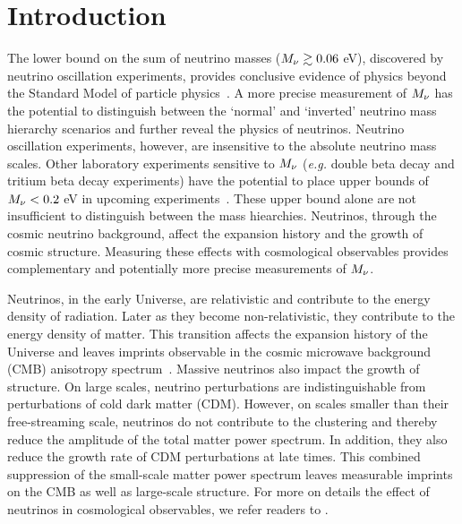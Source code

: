 \section{Introduction}
The lower bound on the sum of neutrino masses ($M_\nu \gtrsim 0.06$ eV), 
discovered by neutrino oscillation experiments, provides conclusive evidence of 
physics beyond the Standard Model of particle physics~\citep{forero2014, gonzalez-garcia2016}. 
A more precise measurement of $M_\nu$ has the potential to distinguish 
between the `normal' and `inverted' neutrino mass hierarchy scenarios 
and further reveal the physics of neutrinos. Neutrino oscillation 
experiments, however, are insensitive to the absolute neutrino mass scales. 
Other laboratory experiments sensitive to $M_\nu$ (\emph{e.g.} double beta 
decay and tritium beta decay experiments) have the potential to place upper 
bounds of $M_\nu < 0.2$ eV in upcoming experiments~\citep{bonn2011, drexlin2013}. 
These upper bound alone are not insufficient to distinguish between the mass
hiearchies. Neutrinos, through the cosmic neutrino background, affect the 
expansion history and the growth of cosmic structure. Measuring these effects 
with cosmological observables provides complementary and potentially more 
precise measurements of $M_\nu$. 

Neutrinos, in the early Universe, are relativistic and contribute to the 
energy density of radiation. Later as they become non-relativistic, 
they contribute to the energy density of matter. This transition affects 
the expansion history of the Universe and leaves imprints observable in 
the cosmic microwave background (CMB) anisotropy spectrum~\citep{lesgourgues2012, lesgourgues2014}. 
Massive neutrinos also impact the growth of structure. On large scales, 
neutrino perturbations are indistinguishable from perturbations of cold 
dark matter (CDM). However, on scales smaller than their free-streaming 
scale, neutrinos do not contribute to the clustering and thereby reduce 
the amplitude of the total matter power spectrum. In addition, they also reduce the growth 
rate of CDM perturbations at late times. This combined suppression of 
the small-scale matter power spectrum leaves measurable imprints 
on the CMB as well as large-scale structure. For more on details the effect
of neutrinos in cosmological observables, we refer readers to 
\cite{lesgourgues2012,lesgourgues2014,gerbino2018}. 

